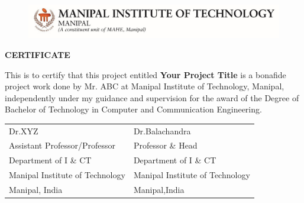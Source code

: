 \begin{figure}[bpht!]
  \begin{center}
	\includegraphics[scale=1]{MITLogo}
	\end{center}
	\end{figure}
\begin{center}
\large{\textbf{CERTIFICATE}}\\
\end{center}


This is to certify that this project entitled \textbf{Your Project Title} is a bonafide project work done by Mr. ABC at Manipal Institute of Technology, Manipal, independently under my guidance and supervision for the award of the Degree of
Bachelor of Technology in Computer and Communication Engineering.



\vspace{4cm}

\begin{table}[h]
	\centering
		\begin{tabular}{p{3in} p{3in}}
			Dr.XYZ &  Dr.Balachandra  \\
			Assistant Professor/Professor & Professor \& Head \\
			  Department of I \& CT&  Department of I \& CT \\
			Manipal Institute of Technology  & Manipal Institute of Technology\\
			Manipal, India &  Manipal,India 
		\end{tabular}
\end{table}